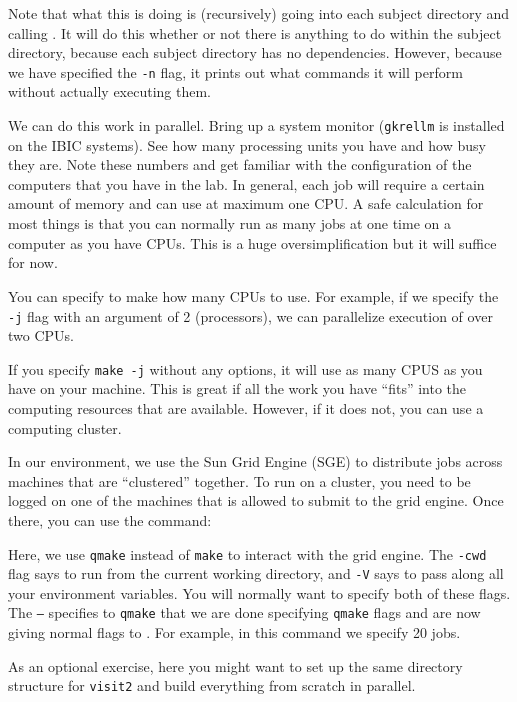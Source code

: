 Note that what this is doing is (recursively) going into each subject directory and calling \maken{}. It will do this whether or not there is anything to do within the subject directory, because each subject directory has no dependencies. However, because we have specified the \texttt{-n} flag, it prints out what commands it will perform without actually executing them.

We can do this work in parallel. Bring up a system monitor (\texttt{gkrellm} is installed on the IBIC systems). See how many processing units you have and how busy they are. Note these numbers and get familiar with the configuration of the computers that you have in the lab. In general, each job will require a certain amount of memory and can use at maximum one CPU. A safe calculation for most things is that you can normally run as many jobs at one time on a computer as you have CPUs. This is a huge oversimplification but it will suffice for now. 

You can specify to make how many CPUs to use. For example, if we specify the \texttt{ -j} flag with an argument of 2 (processors), we can parallelize execution of \maken{} over two CPUs. 

If you specify \texttt{make -j} without any options, it will use as many CPUS as  you have on your machine. This is great if all the work you have ``fits'' into the computing resources that are available. However, if it does not, you can use a computing cluster.

In our environment, we use the Sun Grid Engine (SGE) to distribute jobs across machines that are ``clustered'' together. To run on a cluster, you need to be logged on one of the machines that is allowed to submit to the grid engine.  Once there, you can use the command:

Here, we use \texttt{qmake} instead of \texttt{make} to interact with the grid engine. The \texttt{-cwd} flag says to run from the current working directory, and \texttt{-V} says to pass along all your environment variables. You will normally want to specify both of these flags. The \texttt{--} specifies to \texttt{qmake} that we are done specifying \texttt{qmake} flags and are now giving normal flags to \maken{}. For example, in this command we specify 20 jobs. 

As an optional exercise, here you might want to set up the same directory structure for \texttt{visit2} and build everything from scratch in parallel.

